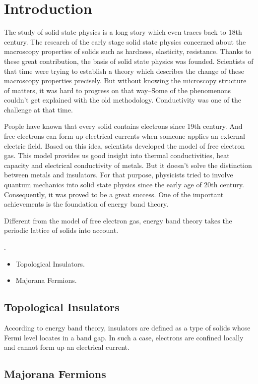 \chapter{\label{chap:intr}Introduction}

The study of solid state physics is a long story which even traces back to 18th century. The research of the early stage solid state physics concerned about the macroscopy properties of solids such as hardness, elasticity, resistance. Thanks to these great contribution, the basis of solid state physics was founded. Scientists of that time were trying to establish a theory which describes the change of these macroscopy properties precisely. But without knowing the microscopy structure of matters, it was hard to progress on that way--Some of the phenomenons couldn't get explained with the old methodology. Conductivity was one of the challenge at that time.

People have known that every solid contains electrons since 19th century. And free electrons can form up electrical currents when someone applies an external electric field. Based on this idea, scientists developed the model of free electron gas. This model provides us good insight into thermal conductivities, heat capacity and electrical conductivity of metals. But it doesn't solve the distinction between metals and insulators. For that purpose, physicists tried to involve quantum mechanics into solid state physics since the early age of 20th century. Consequently, it was proved to be a great success. One of the important achievements is the foundation of energy band theory.

Different from the model of free electron gas, energy band theory takes the periodic lattice of solids into account. 

\cite{einstein1905electrodynamics}.
\begin{itemize}
	\item Topological Insulators.
	\item Majorana Fermions.
\end{itemize}

\clearpage

\section{\label{sec:den_fun_the}Topological Insulators}

According to energy band theory, insulators are defined as a type of solids whose Fermi level locates in a band gap. In such a case, electrons are confined locally and cannot form up an electrical current. 

\section{\label{sec:maj_fer}Majorana Fermions}